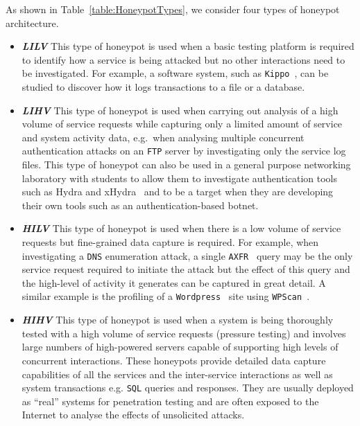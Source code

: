 \documentclass{ieeeaccess}
\begin{document}
As shown in Table~\ref{table:HoneypotTypes}, we consider four types 
of honeypot architecture.

\begin{itemize}

  \item \noindent \emph{\textbf{LILV}} This type of honeypot is used when a
    basic testing platform is required to identify how a service is being
    attacked but no other interactions need to be investigated. For example, a
    software system, such as \texttt{Kippo}~\cite{SH:15}, can be studied to
    discover how it logs transactions to a file or a database. 

  \item \noindent \emph{\textbf{LIHV}} This type of honeypot is used when
    carrying out analysis of a high volume of service requests while capturing
    only a limited amount of service and system activity data, e.g.\ when
    analysing multiple concurrent authentication attacks on an
    \texttt{FTP} server by investigating only the service log files. This type of
    honeypot can also be used in a general purpose networking laboratory with
    students to allow them to investigate authentication tools such as Hydra
    and xHydra~\cite{RS:15} and to be a target when they are developing their
    own tools such as an authentication-based botnet.

  \item \noindent \emph{\textbf{HILV}} This type of honeypot is used when there
    is a low volume of service requests but fine-grained data capture is
    required. For example, when investigating a \texttt{DNS} enumeration
    attack, a single \texttt{AXFR}~\cite{EL:10} query may be the only service
    request required to initiate the attack but the effect of this query and
    the high-level of activity it generates can be captured in great detail.  A
    similar example is the profiling of a \texttt{Wordpress}~\cite{WP:17} site
    using \texttt{WPScan}~\cite{WT:17}.

  \item \noindent \emph{\textbf{HIHV}} This type of honeypot is used when a
    system is being thoroughly tested with a high volume of service requests
    (pressure testing) and involves large numbers of high-powered servers capable
    of supporting high levels of concurrent interactions. These honeypots
    provide detailed data capture capabilities of all the services and the
    inter-service interactions as well as system transactions e.g. \texttt{SQL}
    queries and responses. They are usually deployed as ``real'' systems for
    penetration testing and are often exposed to the Internet to analyse the
    effects of unsolicited attacks.  

\end{itemize}
\end{document}
